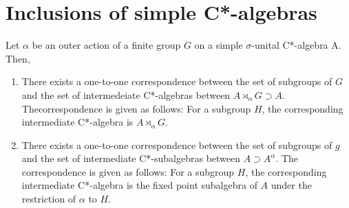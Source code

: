 \section{Inclusions of simple C*-algebras }
\cite{izumi2002inclusions}
\begin{theorem}
  Let $\alpha$ be an outer action of a finite group $G$ on a simple $\sigma$-unital C*-algebra A.
  Then,
  \begin{enumerate}
  \item There exists a one-to-one correspondence between the set of subgroups of $G$ and the set of intermedeiate C*-algebras between $A \rtimes_\alpha G \supset A$.
    Thecorrespondence is given as follows: For a subgroup $H$, the corresponding intermediate C*-algebra is $A \rtimes_\alpha G$.
  \item There exists a one-to-one correspondence between the set of subgroups of $g$ and the set of intermediate C*-subalgebras between $A \supset A^\alpha$.
    The correspondence is given as follows:
    For a subgroup $H$,
    the corresponding intermediate C*-algebra is the fixed point subalgebra of $A$ under the restriction of $\alpha$ to $H$.
  \end{enumerate}
\end{theorem}
